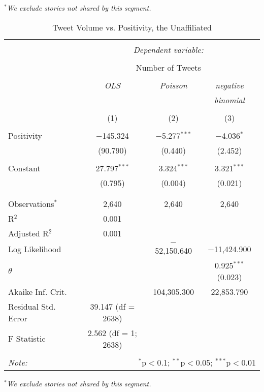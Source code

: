 \emph{$^{*}$We exclude stories not shared by this segment.}  
\newpage 
\begin{table}[!htbp] \centering 
  \caption{Tweet Volume vs. Positivity, the Unaffiliated} 
  \label{} 
    \begin{tabular}{@{\extracolsep{5pt}}lccc} 
    \\[-1.8ex]\hline 
    \hline \\[-1.8ex] 
     & \multicolumn{3}{c}{\textit{Dependent variable:}} \\ 
    \cline{2-4} 
    \\[-1.8ex] & \multicolumn{3}{c}{Number of Tweets} \\ 
    \\[-1.8ex] & \textit{OLS} & \textit{Poisson} & \textit{negative} \\ 
     & \textit{} & \textit{} & \textit{binomial} \\ 
    \\[-1.8ex] & (1) & (2) & (3)\\ 
    \hline \\[-1.8ex] 
     Positivity & $-$145.324 & $-$5.277$^{***}$ & $-$4.036$^{*}$ \\ 
      & (90.790) & (0.440) & (2.452) \\ 
      & & & \\ 
     Constant & 27.797$^{***}$ & 3.324$^{***}$ & 3.321$^{***}$ \\ 
      & (0.795) & (0.004) & (0.021) \\ 
      & & & \\ 
    \hline \\[-1.8ex] 
    Observations$^{*}$ & 2,640 & 2,640 & 2,640 \\ 
    R$^{2}$ & 0.001 &  &  \\ 
    Adjusted R$^{2}$ & 0.001 &  &  \\ 
    Log Likelihood &  & $-$52,150.640 & $-$11,424.900 \\ 
    $\theta$ &  &  & 0.925$^{***}$  (0.023) \\ 
    Akaike Inf. Crit. &  & 104,305.300 & 22,853.790 \\ 
    Residual Std. Error & 39.147 (df = 2638) &  &  \\ 
    F Statistic & 2.562 (df = 1; 2638) &  &  \\ 
    \hline 
    \hline \\[-1.8ex] 
    \textit{Note:}  & \multicolumn{3}{r}{$^{*}$p$<$0.1; $^{**}$p$<$0.05; $^{***}$p$<$0.01} \\ 
    \end{tabular} 
\end{table}
\emph{$^{*}$We exclude stories not shared by this segment.} 
\newpage 

